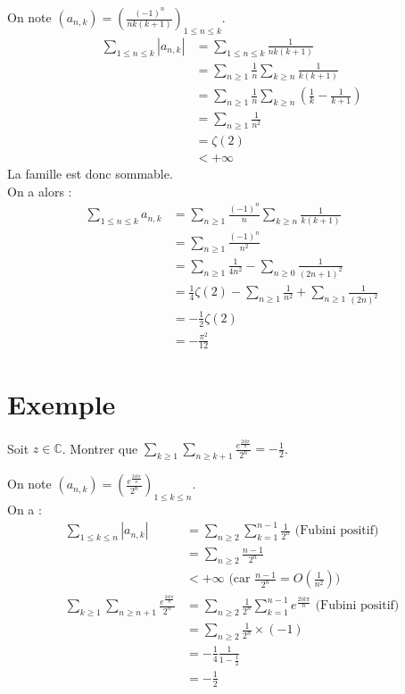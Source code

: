 \documentclass[../main.tex]{subfiles}
\begin{document}
\noindent On note $(a_{n, k}) = \left( \frac{(-1)^n}{nk(k+1)} \right)_{1\leq n\leq k}$. 
\begin{align*}
    \sum_{1\leq n\leq k} |a_{n, k}| &= \sum_{1\leq n\leq k} \frac{1}{nk(k+1)} \\
    &= \sum_{n\geq 1} \frac{1}{n} \sum_{k\geq n} \frac{1}{k(k+1)} \\
    &= \sum_{n\geq 1} \frac{1}{n} \sum_{k\geq n} \left( \frac{1}{k} - \frac{1}{k+1} \right) \\
    &= \sum_{n\geq 1} \frac{1}{n^2} \\
    &= \zeta(2) \\
    &< +\infty 
\end{align*}
La famille est donc sommable. \\
On a alors : 
\begin{align*}
    \sum_{1\leq n\leq k} a_{n, k} &= \sum_{n\geq 1} \frac{(-1)^n}{n} \sum_{k\geq n} \frac{1}{k(k+1)} \\
    &= \sum_{n\geq 1} \frac{(-1)^n}{n^2} \\
    &= \sum_{n\geq 1} \frac{1}{4n^2} - \sum_{n\geq 0} \frac{1}{(2n+1)^2} \\
    &= \frac{1}{4} \zeta(2) - \sum_{n\geq 1} \frac{1}{n^2} + \sum_{n\geq 1} \frac{1}{(2n)^2} \\
    &= -\frac{1}{2} \zeta(2) \\
    &= -\frac{\pi^2}{12}
\end{align*}

\section{Exemple}
\begin{tcolorbox}[title=Exemple 35.37, title filled=false, colframe=darkgreen, colback=darkgreen!10!white]
    Soit $z\in \mathbb{C}$. Montrer que $\sum\limits_{k\geq 1}\sum\limits_{n\geq k+1} \frac{e^{\frac{2ik\pi}{n}}}{2^n} = -\frac{1}{2}$. 
\end{tcolorbox}

\noindent On note $(a_{n, k}) = \left( \frac{e^{\frac{2ik\pi}{n}}}{2^n} \right)_{1\leq k\leq n}$. \\
On a : 
\begin{align*}
    \sum_{1\leq k\leq n} |a_{n, k}| &= \sum_{n\geq 2} \sum_{k=1}^{n-1} \frac{1}{2^n} \text{ (Fubini positif)} \\
    &= \sum_{n\geq 2} \frac{n-1}{2^n} \\
    &< +\infty \text{ (car $\frac{n-1}{2^n} = O\left(\frac{1}{n^2}\right)$)} \\
    \sum_{k\geq 1} \sum_{n\geq n+1} \frac{e^{\frac{2ik\pi}{n}}}{2^n} &= \sum_{n\geq 2} \frac{1}{2^n} \sum_{k=1}^{n-1} e^{\frac{2ik\pi}{n}} \text{ (Fubini positif)} \\
    &= \sum_{n\geq 2} \frac{1}{2^n} \times (-1) \\
    &= - \frac{1}{4} \frac{1}{1 - \frac{1}{2}} \\
    &= -\frac{1}{2}
\end{align*}
\end{document}
